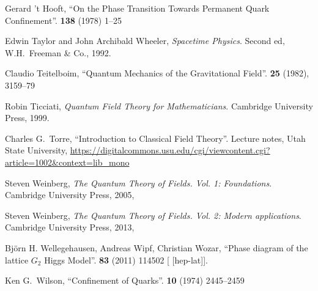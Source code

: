 \begin{thebibliography}{99}
Gerard 't Hooft,
``On the Phase Transition Towards Permanent Quark Confinement''.
 \textbf{138} (1978) 1--25
{\tt{}}

Edwin Taylor and John Archibald Wheeler,
\textit{Spacetime Physics}.
Second ed, W.H.~Freeman \& Co., 1992.

Claudio Teitelboim,
``Quantum Mechanics of the Gravitational Field''.
 \textbf{25} (1982), 3159--79
{\tt{}}

Robin Ticciati,
\textit{Quantum Field Theory for Mathematicians}.
Cambridge University Press, 1999.

Charles G.~Torre,
``Introduction to Classical Field Theory''.
Lecture notes, Utah State University,
\url{https://digitalcommons.usu.edu/cgi/viewcontent.cgi?article=1002&context=lib_mono}

Steven Weinberg,
\textit{The Quantum Theory of Fields. Vol. 1: Foundations}.
Cambridge University Press, 2005,
{\tt{}}

Steven Weinberg,
\textit{The Quantum Theory of Fields. Vol. 2: Modern applications}.
Cambridge University Press, 2013,
{\tt{}}

Bj\"{o}rn H. Wellegehausen, Andreas Wipf, Christian Wozar,
``Phase diagram of the lattice $G_2$ Higgs Model''.
 \textbf{83} (2011) 114502
{\tt{}}
[ [hep-lat]].

Ken G.~Wilson,
``Confinement of Quarks''.
 \textbf{10} (1974) 2445--2459
{\tt{}}

\end{thebibliography}

